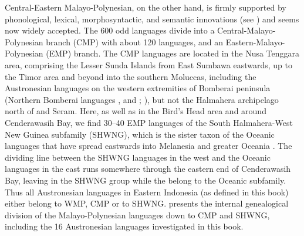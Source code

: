 Central-Eastern Malayo-Polynesian, on the other hand, is firmly supported by phonological, lexical, morphosyntactic, and semantic innovations (see \citealt{blust1993central}) and seems now widely accepted. The 600 odd languages divide into a Central-Malayo-Poly\-ne\-sian branch (CMP) with about 120 languages, and an Eastern-Malayo-Polynesian (EMP) branch. The CMP languages are located in the Nusa Tenggara area, comprising the Lesser Sunda Islands from East Sumbawa eastwards, up to the Timor area and beyond into the southern Moluccas, including the Austronesian languages on the western extremities of Bomberai peninsula (Northern Bomberai languages ,  and ; \citealt[24]{adelaar2005austronesian}), but not the Halmahera archipelago north of  and Seram. Here, as well as in the Bird's Head area and around Cenderawasih Bay, we find 30--40 EMP languages of the South Halmahera-West New Guinea subfamily (SHWNG), which is the sister taxon of the Oceanic languages that have spread eastwards into Melanesia and greater Oceania \citep{blust2009austronesian}. The dividing line between the SHWNG languages in the west and the Oceanic languages in the east runs somewhere through the eastern end of Cenderawasih Bay, leaving  in the SHWNG group while the  belong to the Oceanic subfamily. Thus all Austronesian languages in Eastern Indonesia (as defined in this book) either belong to WMP, CMP or to SHWNG.  presents the internal genealogical division of the Malayo-Polynesian languages down to CMP and SHWNG, including the 16 Austronesian languages investigated in this book.



